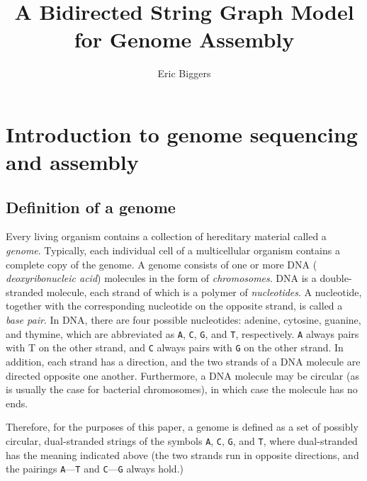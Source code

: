 \documentclass[10pt]{article}
\title{A Bidirected String Graph Model for Genome Assembly}
\author{Eric Biggers}
\begin{document}
\maketitle

\newcommand\Base[1]{{\tt #1}}

\section{Introduction to genome sequencing and assembly}

\subsection{Definition of a genome}

Every living organism contains a collection of hereditary material called a {\em
genome}.  Typically, each individual cell of a multicellular organism contains a
complete copy of the genome.  A genome consists of one or more DNA ({\it
deoxyribonucleic acid}) molecules in the form of {\it chromosomes}.  DNA is a
double-stranded molecule, each strand of which is a polymer of {\em
nucleotides}.  A nucleotide, together with the corresponding nucleotide on the
opposite strand, is called a {\it base pair}.  In DNA, there are four possible
nucleotides: adenine, cytosine, guanine, and thymine, which are abbreviated as
\Base{A}, \Base{C}, \Base{G}, and \Base{T}, respectively.  \Base{A} always pairs
with T on the other strand, and \Base{C} always pairs with \Base{G} on the other
strand.  In addition, each strand has a direction, and the two strands of a DNA
molecule are directed opposite one another.  Furthermore, a DNA molecule may be
circular (as is usually the case for bacterial chromosomes), in which case the
molecule has no ends.

Therefore, for the purposes of this paper, a genome is defined as a set of
possibly circular, dual-stranded strings of the symbols \Base{A}, \Base{C},
\Base{G}, and \Base{T}, where dual-stranded has the meaning indicated above (the
two strands run in opposite directions, and the pairings \Base{A}---\Base{T} and
\Base{C}---\Base{G} always hold.)
\end{document}
